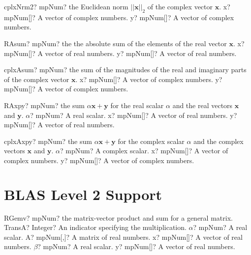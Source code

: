 \documentclass[12pt,a4paper,openany]{book}
\begin{document}
\begin{mpFunctionsExtract}
\mpFunctionTwo
{cplxNrm2? mpNum? the Euclidean norm $||\boldsymbol{x}||_2$ of the complex vector $\boldsymbol{x}$.}
{x? mpNum[]? A vector of complex numbers.}
{y? mpNum[]? A vector of complex numbers.}
\end{mpFunctionsExtract}

\begin{mpFunctionsExtract}
\mpFunctionTwo
{RAsum? mpNum? the the absolute sum of the elements of the real vector $\boldsymbol{x}$.}
{x? mpNum[]? A vector of real numbers.}
{y? mpNum[]? A vector of real numbers.}
\end{mpFunctionsExtract}

\begin{mpFunctionsExtract}
\mpFunctionTwo
{cplxAsum? mpNum? the  sum of the magnitudes of the real and imaginary parts of the complex vector $\boldsymbol{x}$.}
{x? mpNum[]? A vector of complex numbers.}
{y? mpNum[]? A vector of complex numbers.}
\end{mpFunctionsExtract}

\begin{mpFunctionsExtract}
\mpFunctionThree
{RAxpy? mpNum?  the sum $\alpha \boldsymbol{x} + \boldsymbol{y}$ for the real scalar $\alpha$ and the real vectors $\boldsymbol{x}$ and $\boldsymbol{y}$.}
{$\alpha$? mpNum? A real scalar.}
{x? mpNum[]? A vector of real numbers.}
{y? mpNum[]? A vector of real numbers.}
\end{mpFunctionsExtract}

\begin{mpFunctionsExtract}
\mpFunctionThree
{cplxAxpy? mpNum? the sum $\alpha \boldsymbol{x} + \boldsymbol{y}$ for the complex scalar $\alpha$ and the complex vectors $\boldsymbol{x}$ and $\boldsymbol{y}$.}
{$\alpha$? mpNum? A complex scalar.}
{x? mpNum[]? A vector of complex numbers.}
{y? mpNum[]? A vector of complex numbers.}
\end{mpFunctionsExtract}

\section{BLAS Level 2 Support}

\begin{mpFunctionsExtract}
\mpFunctionSix
{RGemv? mpNum? the matrix-vector product and sum for a general matrix.}
{TransA? Integer? An indicator specifying the multiplication.}
{$\alpha$? mpNum? A real scalar.}
{A? mpNum[,]? A matrix of real numbers.}
{x? mpNum[]? A vector of real numbers.}
{$\beta$? mpNum? A real scalar.}
{y? mpNum[]? A vector of real numbers.}
\end{mpFunctionsExtract}
\end{document}
